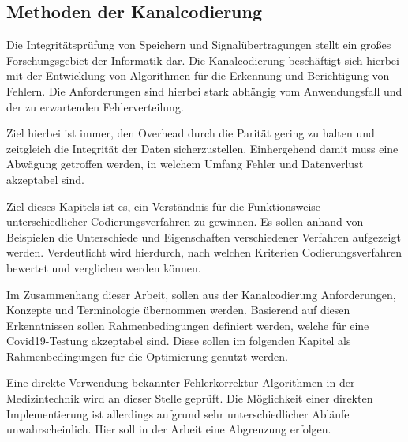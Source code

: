 \subsection{Methoden der Kanalcodierung}
Die Integritätsprüfung von Speichern und Signalübertragungen stellt ein großes Forschungsgebiet der Informatik dar.
Die Kanalcodierung beschäftigt sich hierbei mit der Entwicklung von Algorithmen für die Erkennung und Berichtigung von Fehlern.
Die Anforderungen sind hierbei stark abhängig vom Anwendungsfall und der zu erwartenden Fehlerverteilung.

Ziel hierbei ist immer, den Overhead durch die Parität gering zu halten und zeitgleich die Integrität der Daten sicherzustellen.
Einhergehend damit muss eine Abwägung getroffen werden, in welchem Umfang Fehler und Datenverlust akzeptabel sind.

Ziel dieses Kapitels ist es, ein Verständnis für die Funktionsweise unterschiedlicher Codierungsverfahren zu gewinnen.
Es sollen anhand von Beispielen die Unterschiede und Eigenschaften verschiedener Verfahren aufgezeigt werden.
Verdeutlicht wird hierdurch, nach welchen Kriterien Codierungsverfahren bewertet und verglichen werden können.

Im Zusammenhang dieser Arbeit, sollen aus der Kanalcodierung Anforderungen, Konzepte und Terminologie übernommen werden.
Basierend auf diesen Erkenntnissen sollen Rahmenbedingungen definiert werden, welche für eine Covid19-Testung akzeptabel sind.
Diese sollen im folgenden Kapitel als Rahmenbedingungen für die Optimierung genutzt werden.

Eine direkte Verwendung bekannter Fehlerkorrektur-Algorithmen in der Medizintechnik wird an dieser Stelle geprüft.
Die Möglichkeit einer direkten Implementierung ist allerdings aufgrund sehr unterschiedlicher Abläufe unwahrscheinlich.
Hier soll in der Arbeit eine Abgrenzung erfolgen.

